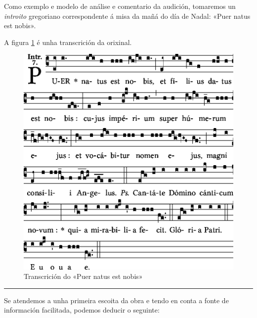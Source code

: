 \documentclass[a4paper, twoside]{templates/ociamthesis}
\begin{document}
\vspace*{0.25cm}

Como exemplo e modelo de análise e comentario da audición, tomaremos un \emph{introito} gregoriano correspondente á misa da mañá do día de Nadal: «Puer natus est nobis».

A figura \ref{fig:Puer-natus-est} é unha transcrición da orixinal.

\par
\vspace*{0.35cm}

\begin{figure}[ht]

{\centering \includegraphics[width=1\linewidth]{figures/audicions/Puer-natus} 

}

\caption[«Puer natus est nobis»]{Transcrición do «Puer natus est nobis» }\label{fig:Puer-natus-est}
\end{figure}

\begin{center}\rule{0.5\linewidth}{0.5pt}\end{center}

Se atendemos a unha primeira escoita da obra e tendo en conta a fonte de información facilitada, podemos deducir o seguinte:
\end{document}
